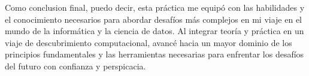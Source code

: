\documentclass{article}
\begin{document}
Como conclusion final, puedo decir, esta práctica me equipó con las habilidades y el conocimiento necesarios para abordar desafíos más
complejos en mi viaje en el mundo de la informática y la ciencia de datos. Al integrar teoría y práctica en un viaje de descubrimiento
computacional, avancé hacia un mayor dominio de los principios fundamentales y las herramientas necesarias para enfrentar los desafíos
del futuro con confianza y perspicacia.


\newpage

\end{document}
